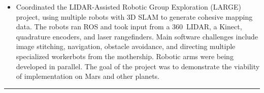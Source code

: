 \documentclass[10pt,letterpaper]{article}
\begin{document}
\begin{itemize}
\begin{itemize}
        \item Coordinated the LIDAR-Assisted Robotic Group Exploration (LARGE)
            project, using multiple robots with 3D SLAM to generate cohesive
            mapping data.  The robots ran ROS and took input from a 360\degree\
            LIDAR, a Kinect, quadrature encoders, and laser rangefinders.  Main
            software challenges include image stitching, navigation, obstacle
            avoidance, and directing multiple specialized workerbots from the
            mothership.  Robotic arms were being developed in parallel.  The
            goal of the project was to demonstrate the viability of
            implementation on Mars and other planets.
	\end{itemize}
\end{itemize}

\hrule
\vspace{-0.4em}
\end{document}
